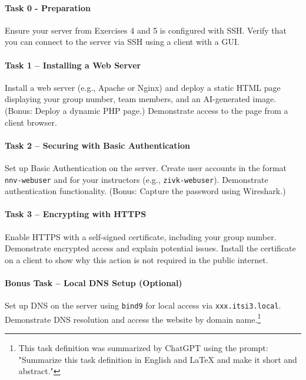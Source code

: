 \documentclass[a4paper]{article}
\newcommand{\abc}{\hfill \break}
\begin{document}
\paragraph*{Task 0 - Preparation}\abc
Ensure your server from Exercises 4 and 5 is configured with SSH. Verify that you can connect to the server via SSH using a client with a GUI.

\paragraph*{Task 1 – Installing a Web Server}\abc
Install a web server (e.g., Apache or Nginx) and deploy a static HTML page displaying your group number, team members, and an AI-generated image. (Bonus: Deploy a dynamic PHP page.) Demonstrate access to the page from a client browser.

\paragraph*{Task 2 – Securing with Basic Authentication}\abc
Set up Basic Authentication on the server. Create user accounts in the format \texttt{nnv-webuser} and for your instructors (e.g., \texttt{zivk-webuser}). Demonstrate authentication functionality. (Bonus: Capture the password using Wireshark.)

\paragraph*{Task 3 – Encrypting with HTTPS}\abc
Enable HTTPS with a self-signed certificate, including your group number. Demonstrate encrypted access and explain potential issues. Install the certificate on a client to show why this action is not required in the public internet.

\paragraph*{Bonus Task – Local DNS Setup (Optional)}\abc
Set up DNS on the server using \texttt{bind9} for local access via \texttt{xxx.itsi3.local}. Demonstrate DNS resolution and access the website by domain name.\footnote{This task definition was summarized by ChatGPT using the prompt: "Summarize this task definition in English and LaTeX and make it short and abstract."}
\end{document}
